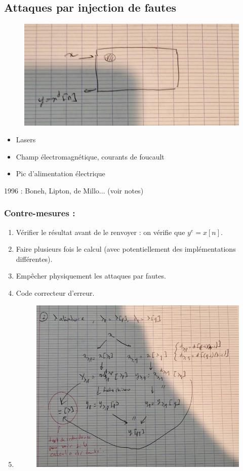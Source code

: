         \subsection{Attaques par injection de fautes}
            \begin{figure}[H]
                \centering
                \includegraphics[width=.5\textwidth]{pictures/09}
            \end{figure} \noindent
            \begin{itemize}
                \item Lasers
                \item Champ électromagnétique, courants de foucault
                \item Pic d'alimentation électrique
            \end{itemize}
            1996 : Boneh, Lipton, de Millo... (voir notes) 

            \subsubsection{Contre-mesures :}
                \begin{enumerate}
                    \item Vérifier le résultat avant de le renvoyer : on vérifie que $y^e = x [n]$.
                    \item Faire plusieurs fois le calcul (avec potentiellement des implémentations différentes).
                    \item Empêcher physiquement les attaques par fautes.
                    \item Code correcteur d'erreur.
                    \item \begin{figure}[H]
                        \centering
                        \includegraphics[width=.5\textwidth]{pictures/10}
                    \end{figure} \noindent
                \end{enumerate}

